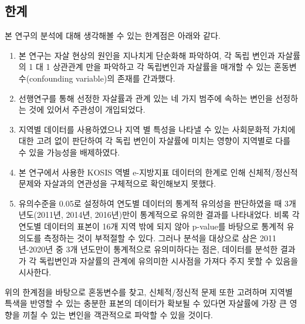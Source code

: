 \documentclass[a4paper, 11pt]{oblivoir}
\begin{document}
    \subsection{한계}
    
    본 연구의 분석에 대해 생각해볼 수 있는 한계점은 아래와 같다. 

    \begin{enumerate}
        \item 본 연구는 자살 현상의 원인을 지나치게 단순화해 파악하여, 각 독립 변인과 자살률의 1 대 1 상관관계 만을 파악하고 각 독립변인과
        자살률을 매개할 수 있는 혼동변수(confounding variable)의 존재를 간과했다.
        \item 선행연구를 통해 선정한 자살률과 관계 있는 네 가지 범주에 속하는 변인을 선정하는 것에 있어서 주관성이 개입되었다.
        \item 지역별 데이터를 사용하였으나 지역 별 특성을 나타낼 수 있는 사회문화적 가치에 대한 고려 없이 판단하여 각 독립 변인이
        자살률에 미치는 영향이 지역별로 다를 수 있을 가능성을 배제하였다.
        \item 본 연구에서 사용한 KOSIS 역별 e-지방지표 데이터의 한계로 인해 신체적/정신적 문제와 자살과의 연관성을 구체적으로 확인해보지 못했다.
        \item 유의수준을 0.05로 설정하여 연도별 데이터의 통계적 유의성을 판단하였을 때 3개 년도(2011년, 2014년, 2016년)만이 통계적으로 유의한 
        결과를 나타내었다. 비록 각 연도별 데이터의 표본이 16개 지역 밖에 되지 않아 p-value를 바탕으로 통계적 유의도를 측정하는 것이 
        부적절할 수 있다. 그러나 분석을 대상으로 삼은 2011년-2020년 중 3개 년도만이 통계적으로 유의미하다는 점은, 데이터를 분석한 결과가 각 독립변인과 자살률의 관계에 유의미한 시사점을 가져다 
        주지 못할 수 있음을 시사한다.  
    \end{enumerate}

    위의 한계점을 바탕으로 혼동변수를 찾고, 신체적/정신적 문제 또한 고려하며 지역별 특색을 반영할 수 있는 충분한 표본의 데이터가 확보될 수 있다면 
    자살률에 가장 큰 영향을 끼칠 수 있는 변인을 객관적으로 파악할 수 있을 것이다. 

    \pagebreak
\end{document}
